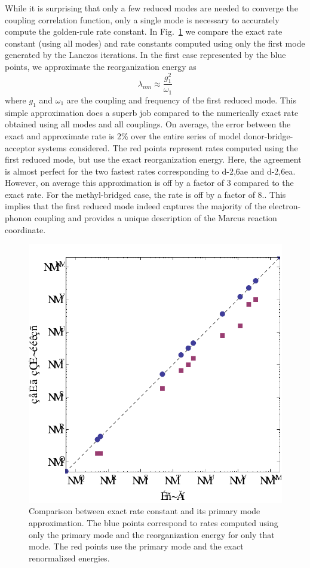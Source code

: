 While it is surprising that only a few reduced modes are needed to converge the coupling correlation function, only
a single mode is necessary to accurately compute the golden-rule rate constant.
In Fig.~\ref{fig-1mode} we compare the exact rate constant (using all modes) and rate constants computed using
only the first mode generated by the Lanczos iterations.   In the first case represented by the blue points,
we approximate the reorganization energy as
$$
\lambda_{nm} \approx \frac{g_{1}^{2}}{\omega_1}
$$
where $g_{1}$ and $\omega_{1}$ are the coupling and frequency of the first  reduced mode.  This simple approximation
does a superb job compared to the numerically exact rate obtained using all modes and all couplings.
On average, the error between the exact and approximate rate is 2\%
over the entire series of model donor-bridge-acceptor systems considered.
The red points represent rates computed using the first reduced mode, but use the exact reorganization energy.
Here, the agreement is almost perfect for the two fastest rates corresponding to d-2,6ae and d-2,6ea.   However,  on average
this approximation is off by a factor of 3 compared to the exact rate.  For the methyl-bridged case, the rate is off by a factor of 8..
This implies that the first reduced mode indeed captures the majority of the electron-phonon coupling
 and provides a unique description of the Marcus reaction coordinate.

\begin{figure}[t]
\includegraphics[width=0.6\columnwidth]{Chapters/chap2/Figure6}
\caption{Comparison between exact rate constant and its primary mode approximation.  The blue points correspond to rates computed using
only the primary mode and the reorganization energy for only that mode.  The red points use the primary mode and the exact
renormalized energies. }\label{fig-1mode}
\end{figure}

